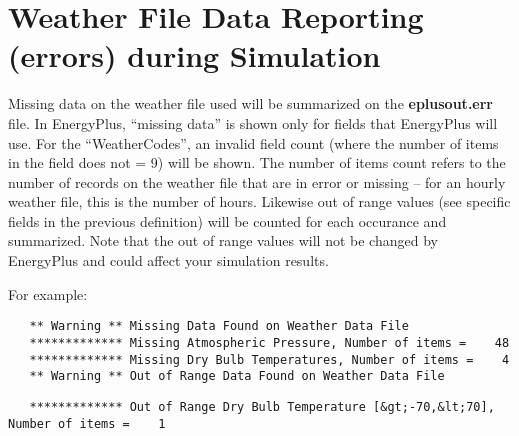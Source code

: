 \section{Weather File Data Reporting (errors) during Simulation}\label{weather-file-data-reporting-errors-during-simulation}

Missing data on the weather file used will be summarized on the \textbf{eplusout.err} file. In EnergyPlus, ``missing data'' is shown only for fields that EnergyPlus will use. For the ``WeatherCodes'', an invalid field count (where the number of items in the field does not = 9) will be shown. The number of items count refers to the number of records on the weather file that are in error or missing -- for an hourly weather file, this is the number of hours. Likewise out of range values (see specific fields in the previous definition) will be counted for each occurance and summarized. Note that the out of range values will not be changed by EnergyPlus and could affect your simulation results.

For example:

\begin{lstlisting}
   ** Warning ** Missing Data Found on Weather Data File
   ************* Missing Atmospheric Pressure, Number of items =    48
   ************* Missing Dry Bulb Temperatures, Number of items =    4
   ** Warning ** Out of Range Data Found on Weather Data File
\end{lstlisting}

\begin{lstlisting}
   ************* Out of Range Dry Bulb Temperature [&gt;-70,&lt;70], Number of items =    1
\end{lstlisting}

